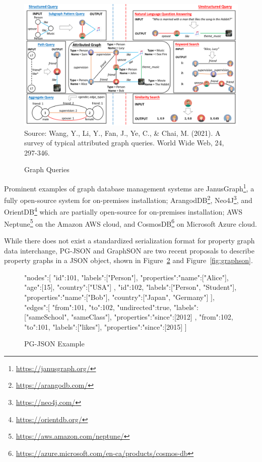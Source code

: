 \begin{figure}
\includegraphics[width=\textwidth]{screen3.png}
\scriptsize
Source: Wang, Y., Li, Y., Fan, J., Ye, C., \& Chai, M. (2021). A survey of typical attributed graph queries. World Wide Web, 24, 297-346.
\caption{Graph Queries}
\label{fig:graphqueries}
\end{figure}

Prominent examples of graph database management systems are JanusGraph\footnote{\url{https://janusgraph.org/}}, a fully open-source system for on-premises installation; ArangodDB\footnote{\url{https://arangodb.com/}}, Neo4J\footnote{\url{https://neo4j.com/}}, and OrientDB\footnote{\url{https://orientdb.org/}} which are partially open-source for on-premises installation; AWS Neptune\footnote{\url{https://aws.amazon.com/neptune/}} on the Amazon AWS cloud, and CosmosDB\footnote{\url{https://azure.microsoft.com/en-ca/products/cosmos-db}} on Microsoft Azure cloud. 

While there does not exist a standardized serialization format for property graph data interchange, PG-JSON and GraphSON are two recent proposals to describe property graphs in a JSON object, shown in Figure~\ref{fig:pgjson} and Figure~\ref{fig:graphson}.

\begin{figure}[h]
\begin{jsoncode}
{
  "nodes":[
    {
     "id":101,
     "labels":["Person"],
     "properties":{"name":["Alice"], "age":[15], "country":["USA"]}
    },
    {
     "id":102,
     "labels":["Person", "Student"],
     "properties":{"name":["Bob"], "country":["Japan", "Germany"]}
    }
  ],
  "edges":[
    {
     "from":101,
     "to":102,
     "undirected":true,
     "labels":["sameSchool", "sameClass"],
     "properties":{"since":[2012]}
    },
    {
     "from":102,
     "to":101,
     "labels":["likes"],
     "properties":{"since":[2015]}
    }
  ]
}
\end{jsoncode}

\caption{PG-JSON Example}
\label{fig:pgjson}

\end{figure}

